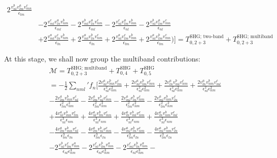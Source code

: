 \documentclass[twocolumn, prx, reprint, amsfonts, amsmath, amssymb, longbibliography, floatfix, aps]{revtex4-2}
\begin{document}
\begin{equation}
\begin{aligned}
		2\frac{v^b_{nl}v^a_{lm}v^c_{mn}}{\epsilon_{lm}} \\
		&- 2\frac{v^c_{ml}v^a_{ln}v^b_{nm}}{\epsilon_{ml}} - 2\frac{v^b_{ml}v^a_{ln}v^c_{nm}}{\epsilon_{ml}} - 2\frac{v^c_{nl}v^a_{lm}v^b_{mn}}{\epsilon_{nl}} -
		2\frac{v^b_{nl}v^a_{lm}v^c_{mn}}{\epsilon_{nl}} \\
		&+ 2\frac{v^a_{ml}v^c_{ln}v^b_{nm}}{\epsilon_{ln}} + 2\frac{v^a_{ml}v^b_{ln}v^c_{nm}}{\epsilon_{ln}} + 2\frac{v^a_{nl}v^c_{lm}v^b_{mn}}{\epsilon_{lm}} +
		2\frac{v^a_{nl}v^b_{lm}v^c_{mn}}{\epsilon_{lm}} \Big)\Big]
        = T^{\text{SHG; two-band}}_{0, 2+3} + T^{\text{SHG; multiband} }_{0, 2+3}
	\end{aligned}
\end{equation}

At this stage, we shall now group the multiband contributions:
\begin{equation}
	\begin{aligned}
		&\mathcal{M} = T^{\text{SHG; multiband} }_{0, 2+3} + T^{\text{SHG}}_{0, 4} + T^{\text{SHG}}_{0, 5} \\
		&= - \frac{1}{2} {\textstyle \sum_{nml}'} f_n\Big[\frac{2v^{a}_{nl}v^b_{mn}v^c_{lm}}{\epsilon^2_{nl}\epsilon^2_{nm}} + \frac{2v^{a}_{nl}v^b_{lm}v^c_{mn}}{\epsilon^2_{nl}\epsilon^2_{nm}} + 
		\frac{2v^{a}_{ln}v^b_{ml}v^c_{nm}}{\epsilon^2_{nl}\epsilon^2_{nm}} + 
		\frac{2v^{a}_{ln}v^b_{nm}v^c_{ml}}{\epsilon^2_{nl}\epsilon^2_{nm}}  \\
		&- \frac{2v^{a}_{lm}v^b_{mn}v^c_{nl}}{\epsilon^2_{lm}\epsilon^2_{nm}} - \frac{2v^{a}_{lm}v^b_{nl}v^c_{mn}}{\epsilon^2_{lm}\epsilon^2_{nm}} - 
		\frac{2v^{a}_{ml}v^b_{ln}v^c_{nm}}{\epsilon^2_{lm}\epsilon^2_{nm}} - 
		\frac{2v^{a}_{ml}v^b_{nm}v^c_{ln}}{\epsilon^2_{lm}\epsilon^2_{nm}} \\
		&+\frac{4v^{a}_{nl}v^b_{mn}v^c_{lm}}{\epsilon^3_{nl}\epsilon_{nm}} + \frac{4v^{a}_{nl}v^b_{lm}v^c_{mn}}{\epsilon^3_{nl}\epsilon_{nm}} + 
		\frac{4v^{a}_{ln}v^b_{ml}v^c_{nm}}{\epsilon^3_{nl}\epsilon_{nm}} + 
		\frac{4v^{a}_{ln}v^b_{nm}v^c_{ml}}{\epsilon^3_{nl}\epsilon_{nm}}  \\
		&- \frac{4v^{a}_{lm}v^b_{mn}v^c_{nl}}{\epsilon^3_{lm}\epsilon_{ln}} - \frac{4v^{a}_{lm}v^b_{nl}v^c_{mn}}{\epsilon^3_{lm}\epsilon_{ln}} - 
		\frac{4v^{a}_{ml}v^b_{ln}v^c_{nm}}{\epsilon^3_{lm}\epsilon_{ln}} - 
		\frac{4v^{a}_{ml}v^b_{nm}v^c_{ln}}{\epsilon^3_{lm}\epsilon_{ln}}  \\ &-2\frac{v^b_{nl}v^c_{lm}v^a_{mn}}{\epsilon_{nl}\epsilon_{nm}^3} - 2\frac{v^c_{nl}v^b_{lm}v^a_{mn}}{\epsilon_{nl}\epsilon_{nm}^3} -
		2\frac{v^c_{ml}v^b_{ln}v^a_{nm}}{\epsilon_{nl}\epsilon_{nm}^3} - 

\end{aligned}
\end{equation}
\end{document}
